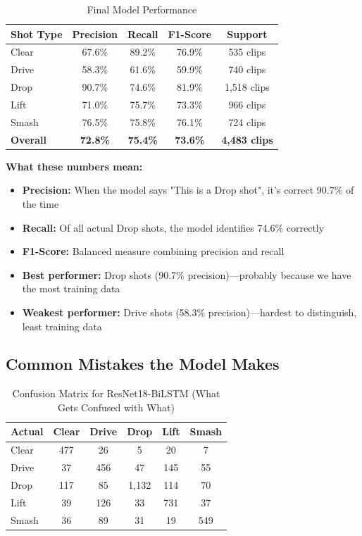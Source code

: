 \documentclass[11pt,a4paper]{article}
\begin{document}
\begin{table}[H]
\centering
\caption{Final Model Performance}
\begin{tabular}{lcccc}
\toprule
\textbf{Shot Type} & \textbf{Precision} & \textbf{Recall} & \textbf{F1-Score} & \textbf{Support} \\
\midrule
Clear & 67.6\% & 89.2\% & 76.9\% & 535 clips \\
Drive & 58.3\% & 61.6\% & 59.9\% & 740 clips \\
Drop & 90.7\% & 74.6\% & 81.9\% & 1,518 clips \\
Lift & 71.0\% & 75.7\% & 73.3\% & 966 clips \\
Smash & 76.5\% & 75.8\% & 76.1\% & 724 clips \\
\midrule
\textbf{Overall} & \textbf{72.8\%} & \textbf{75.4\%} & \textbf{73.6\%} & \textbf{4,483 clips} \\
\bottomrule
\end{tabular}
\end{table}

\textbf{What these numbers mean:}
\begin{itemize}
\item \textbf{Precision:} When the model says "This is a Drop shot", it's correct 90.7\% of the time
\item \textbf{Recall:} Of all actual Drop shots, the model identifies 74.6\% correctly
\item \textbf{F1-Score:} Balanced measure combining precision and recall
\item \textbf{Best performer:} Drop shots (90.7\% precision)---probably because we have the most training data
\item \textbf{Weakest performer:} Drive shots (58.3\% precision)---hardest to distinguish, least training data
\end{itemize}

\subsection{Common Mistakes the Model Makes}

\begin{table}[H]
\centering
\caption{Confusion Matrix for ResNet18-BiLSTM (What Gets Confused with What)}
\begin{tabular}{lccccc}
\toprule
\textbf{Actual} & \textbf{Clear} & \textbf{Drive} & \textbf{Drop} & \textbf{Lift} & \textbf{Smash} \\
\midrule
Clear & 477 & 26 & 5 & 20 & 7 \\
Drive & 37 & 456 & 47 & 145 & 55 \\
Drop & 117 & 85 & 1,132 & 114 & 70 \\
Lift & 39 & 126 & 33 & 731 & 37 \\
Smash & 36 & 89 & 31 & 19 & 549 \\
\bottomrule
\end{tabular}
\end{table}
\end{document}
